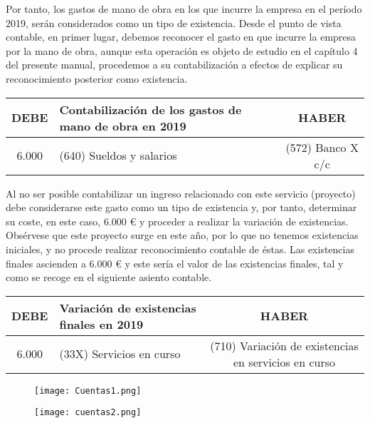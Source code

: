 \documentclass{article}
\begin{document}
Por tanto, los gastos de mano de obra en los que incurre la empresa en el período 2019, serán considerados como un tipo de existencia. Desde el punto de vista contable, en primer lugar, debemos reconocer el gasto en que incurre la empresa por la mano de obra, aunque esta operación es objeto de estudio en el capítulo 4 del presente manual, procedemos a su contabilización a efectos de explicar su reconocimiento posterior como existencia.

\begin{table}[h!]
\centering
\begin{tabular}{|c|p{4cm}|c|}
\hline
\textbf{DEBE} & \textbf{Contabilización de los gastos de mano de obra en 2019} & \textbf{HABER} \\
\hline
6.000 & (640) Sueldos y salarios & (572) Banco X c/c \\
\hline
\end{tabular}
\end{table}

Al no ser posible contabilizar un ingreso relacionado con este servicio (proyecto) debe considerarse este gasto como un tipo de existencia y, por tanto, determinar su coste, en este caso, 6.000 € y proceder a realizar la variación de existencias. Obsérvese que este proyecto surge en este año, por lo que no tenemos existencias iniciales, y no procede realizar reconocimiento contable de éstas. Las existencias finales ascienden a 6.000 € y este sería el valor de las existencias finales, tal y como se recoge en el siguiente asiento contable.

\begin{table}[h!]
\centering
\begin{tabular}{|c|p{4cm}|c|}
\hline
\textbf{DEBE} & \textbf{Variación de existencias finales en 2019} & \textbf{HABER} \\
\hline
6.000 & (33X) Servicios en curso & (710) Variación de existencias en servicios en curso \\
\hline
\end{tabular}
\end{table}

\begin{figure}[H]
    \centering
    \texttt{[image: Cuentas1.png]}
\end{figure}

\begin{figure}[H]
    \centering
    \texttt{[image: cuentas2.png]}
\end{figure}
\end{document}
